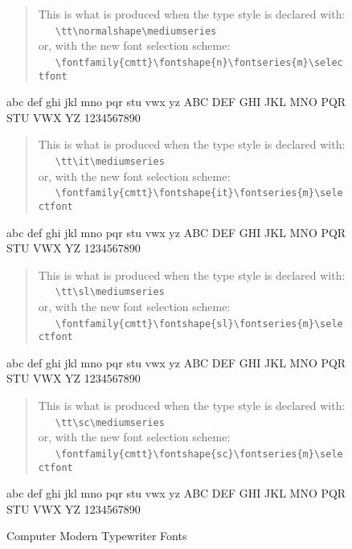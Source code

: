 \begin{figure}
\begin{singlespace}
\begin{verse}
This is what is produced when the type style is declared with:\\
\ \ \ \verb+\tt\normalshape\mediumseries+\\
or, with the new font selection scheme:\\
\ \ \ \verb+\fontfamily{cmtt}\fontshape{n}\fontseries{m}\selectfont+\\
\end{verse}
{\selectfont
abc def ghi jkl mno pqr stu vwx yz ABC DEF GHI JKL MNO PQR STU
VWX YZ 1234567890\par}
\vspace{1em}
\begin{verse}
This is what is produced when the type style is declared with:\\
\ \ \ \verb+\tt\it\mediumseries+\\
or, with the new font selection scheme:\\
\ \ \ \verb+\fontfamily{cmtt}\fontshape{it}\fontseries{m}\selectfont+\\
\end{verse}
{\selectfont
abc def ghi jkl mno pqr stu vwx yz ABC DEF GHI JKL MNO PQR STU
VWX YZ 1234567890\par}
\vspace{1em}
\begin{verse}
This is what is produced when the type style is declared with:\\
\ \ \ \verb+\tt\sl\mediumseries+\\
or, with the new font selection scheme:\\
\ \ \ \verb+\fontfamily{cmtt}\fontshape{sl}\fontseries{m}\selectfont+\\
\end{verse}
{\selectfont
abc def ghi jkl mno pqr stu vwx yz ABC DEF GHI JKL MNO PQR STU
VWX YZ 1234567890\par}
\vspace{1em}
\begin{verse}
This is what is produced when the type style is declared with:\\
\ \ \ \verb+\tt\sc\mediumseries+\\
or, with the new font selection scheme:\\
\ \ \ \verb+\fontfamily{cmtt}\fontshape{sc}\fontseries{m}\selectfont+\\
\end{verse}
{\selectfont
abc def ghi jkl mno pqr stu vwx yz ABC DEF GHI JKL MNO PQR STU
VWX YZ 1234567890\par}
\vspace{1em}
\caption{Computer Modern Typewriter Fonts}
\label{fig:cmtt}
\end{singlespace}
\end{figure}
 
